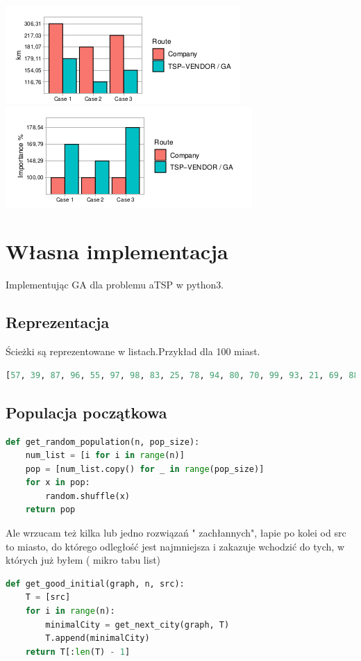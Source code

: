 \documentclass[11pt]{article}
\begin{document}
\includegraphics[scale=1.0]{gr2.png}
\includegraphics[scale=1.0]{gr3.png}
\section{Własna implementacja}
Implementując GA dla problemu aTSP w python3.
\subsection{Reprezentacja}
Ścieżki są reprezentowane w listach.Przykład dla 100 miast.
\begin{lstlisting}[language=Python]
[57, 39, 87, 96, 55, 97, 98, 83, 25, 78, 94, 80, 70, 99, 93, 21, 69, 88, 95, 72, 76, 89, 85, 36, 92, 59, 20, 6, 38, 28, 60, 16, 5, 51, 48, 1, 90, 67, 86, 45, 49, 34, 91, 19, 35, 30, 53, 77, 62, 82, 64, 7, 63, 73, 47, 15, 0, 79, 44, 43, 14, 42, 84, 46, 71, 81, 40, 31, 11, 10, 33, 61, 23, 65, 24, 66, 37, 18, 75, 3, 32, 29, 4, 41, 27, 50, 17, 26, 12, 58, 74, 54, 2, 56, 13, 52, 68, 8, 9, 22]
\end{lstlisting}
\subsection{Populacja początkowa}
\begin{lstlisting}[language=Python]
def get_random_population(n, pop_size):
    num_list = [i for i in range(n)]
    pop = [num_list.copy() for _ in range(pop_size)]
    for x in pop:
        random.shuffle(x)
    return pop
\end{lstlisting}
Ale wrzucam też kilka lub jedno rozwiązań " zachłannych", łapie po kolei od src to miasto, do którego odległość jest najmniejsza i zakazuje wchodzić do tych, w których już byłem ( mikro tabu list)
\begin{lstlisting}[language=Python]
def get_good_initial(graph, n, src):
    T = [src]
    for i in range(n):
        minimalCity = get_next_city(graph, T)
        T.append(minimalCity)
    return T[:len(T) - 1]
\end{lstlisting}
\end{document}
